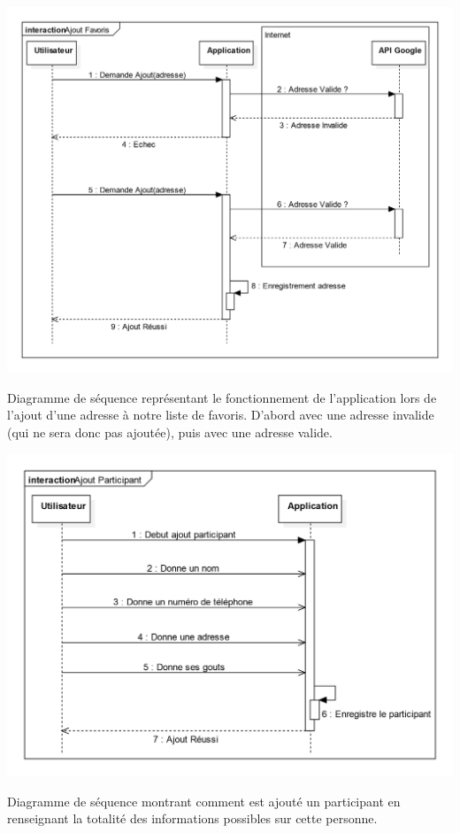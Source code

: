\documentclass[a4paper, 12pt, notitlepage]{article} %
\begin{document}
\begin{umlFig}[!htb]
   \centering
   \includegraphics[width=\textwidth]{AjoutFavoris.png}
   \caption[Diagramme d'ajout d'un lieu en favoris]{Diagramme de séquence représentant le fonctionnement de l'application lors de l'ajout d'une adresse à notre liste de favoris. D'abord avec une adresse invalide (qui ne sera donc pas ajoutée), puis avec une adresse valide.}
   \label{UML:AjoutFavoris}
\end{umlFig}

\begin{umlFig}[!htb]
   \centering
   \includegraphics[width=\textwidth]{AjoutParticipant.png}
   \caption[Diagramme d'ajout d'un participant]{Diagramme de séquence montrant comment est ajouté un participant en renseignant la totalité des informations possibles sur cette personne.}
   \label{UML:AjoutParticipant}
\end{umlFig}
\end{document}
